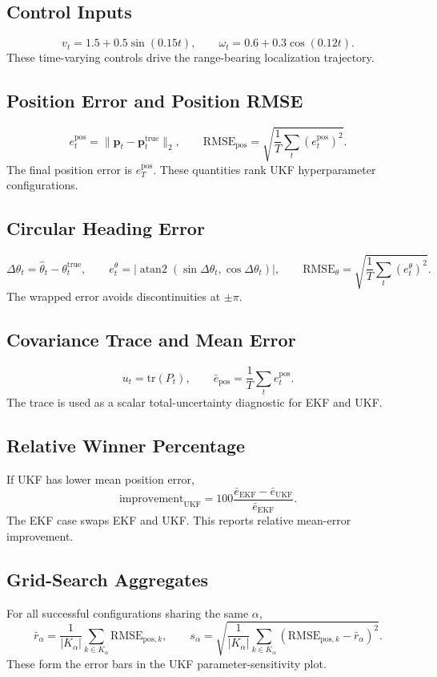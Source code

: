 \documentclass[11pt]{article}
\newcommand{\tr}{\mathrm{tr}}
\newcommand{\RMSE}{\mathrm{RMSE}}
\begin{document}
\subsection*{Control Inputs}
\[
v_t=1.5+0.5\sin(0.15t),\qquad
\omega_t=0.6+0.3\cos(0.12t).
\]
These time-varying controls drive the range-bearing localization trajectory.

\subsection*{Position Error and Position RMSE}
\[
e^{\mathrm{pos}}_t=\|\hat{\bm{p}}_t-\bm{p}^{\mathrm{true}}_t\|_2,\qquad
\RMSE_{\mathrm{pos}}=\sqrt{\frac{1}{T}\sum_t(e^{\mathrm{pos}}_t)^2}.
\]
The final position error is \(e^{\mathrm{pos}}_T\). These quantities rank UKF hyperparameter configurations.

\subsection*{Circular Heading Error}
\[
\Delta\theta_t=\hat\theta_t-\theta^{\mathrm{true}}_t,\qquad
e^\theta_t=\left|\operatorname{atan2}(\sin\Delta\theta_t,\cos\Delta\theta_t)\right|,
\qquad
\RMSE_\theta=\sqrt{\frac{1}{T}\sum_t(e^\theta_t)^2}.
\]
The wrapped error avoids discontinuities at \(\pm\pi\).

\subsection*{Covariance Trace and Mean Error}
\[
u_t=\tr(P_t),\qquad
\bar e_{\mathrm{pos}}=\frac{1}{T}\sum_t e^{\mathrm{pos}}_t.
\]
The trace is used as a scalar total-uncertainty diagnostic for EKF and UKF.

\subsection*{Relative Winner Percentage}
If UKF has lower mean position error,
\[
\mathrm{improvement}_{\mathrm{UKF}}
=100\frac{\bar e_{\mathrm{EKF}}-\bar e_{\mathrm{UKF}}}{\bar e_{\mathrm{EKF}}}.
\]
The EKF case swaps EKF and UKF. This reports relative mean-error improvement.

\subsection*{Grid-Search Aggregates}
For all successful configurations sharing the same \(\alpha\),
\[
\bar r_\alpha=\frac{1}{|K_\alpha|}\sum_{k\in K_\alpha}\RMSE_{\mathrm{pos},k},
\qquad
s_\alpha=\sqrt{\frac{1}{|K_\alpha|}\sum_{k\in K_\alpha}(\RMSE_{\mathrm{pos},k}-\bar r_\alpha)^2}.
\]
These form the error bars in the UKF parameter-sensitivity plot.
\end{document}
